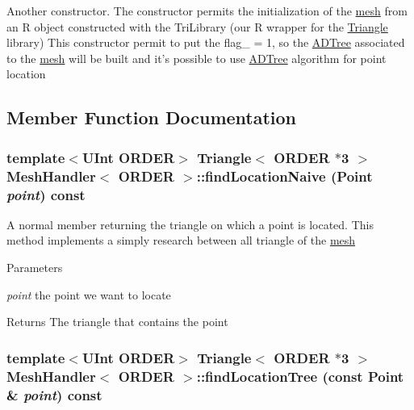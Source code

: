 Another constructor. The constructor permits the initialization of the \hyperlink{structmesh}{mesh} from an R object constructed with the TriLibrary (our R wrapper for the \hyperlink{classTriangle}{Triangle} library) This constructor permit to put the flag\_\- = 1, so the \hyperlink{classADTree}{ADTree} associated to the \hyperlink{structmesh}{mesh} will be built and it's possible to use \hyperlink{classADTree}{ADTree} algorithm for point location 

\subsection{Member Function Documentation}
\hypertarget{classMeshHandler_ac101637668e7960b5ed960bb0d55a1af}{
\subsubsection[{findLocationNaive}]{\setlength{\rightskip}{0pt plus 5cm}template$<$UInt ORDER$>$ {\bf Triangle}$<$ ORDER $\ast$3 $>$ {\bf MeshHandler}$<$ ORDER $>$::findLocationNaive ({\bf Point} {\em point}) const}}
\label{classMeshHandler_ac101637668e7960b5ed960bb0d55a1af}


A normal member returning the triangle on which a point is located. This method implements a simply research between all triangle of the \hyperlink{structmesh}{mesh} 
\begin{DoxyParams}{Parameters}
\item[{\em point}]the point we want to locate \end{DoxyParams}
\begin{DoxyReturn}{Returns}
The triangle that contains the point 
\end{DoxyReturn}
\hypertarget{classMeshHandler_a2ebf0f4f46e7e74089ce40196d3ed596}{
\subsubsection[{findLocationTree}]{\setlength{\rightskip}{0pt plus 5cm}template$<$UInt ORDER$>$ {\bf Triangle}$<$ ORDER $\ast$3 $>$ {\bf MeshHandler}$<$ ORDER $>$::findLocationTree (const {\bf Point} \& {\em point}) const}}
\label{classMeshHandler_a2ebf0f4f46e7e74089ce40196d3ed596}


